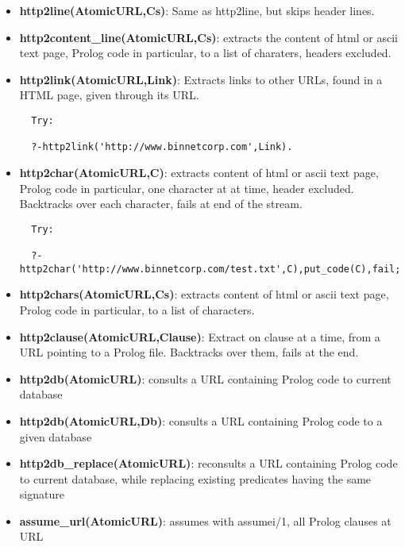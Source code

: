\documentclass{article}
\begin{document}
\begin{itemize}
\item {\bf http2line(AtomicURL,Cs)}:
 Same as http2line, but skips header lines.

\item {\bf http2content\_line(AtomicURL,Cs)}: 
extracts the content of html or ascii text page, Prolog code in particular,
to a list of charaters, headers excluded.

\item {\bf http2link(AtomicURL,Link)}: Extracts links to other URLs, found in a HTML page,
  given through its URL.
\begin{verbatim}
  Try:

  ?-http2link('http://www.binnetcorp.com',Link).
\end{verbatim}


\item {\bf http2char(AtomicURL,C)}:
  extracts content of html or ascii text page, Prolog code in particular,
  one character at at time, header excluded.
  Backtracks over each character, fails at end of the stream.
\begin{verbatim}
  Try:

  ?-http2char('http://www.binnetcorp.com/test.txt',C),put_code(C),fail;nl.
\end{verbatim}


\item {\bf http2chars(AtomicURL,Cs)}: extracts content of html or ascii text page, Prolog code in particular,
to a list of characters.

\item {\bf http2clause(AtomicURL,Clause)}:  Extract on clause at a time, from a URL pointing to a Prolog file.
  Backtracks over them, fails at the end. 

\item {\bf http2db(AtomicURL)}:  consults a URL containing Prolog code to current database


\item {\bf http2db(AtomicURL,Db)}:  consults a URL containing Prolog code to a given database

\item {\bf http2db\_replace(AtomicURL)}:  reconsults a URL containing Prolog code to current database,
  while replacing existing predicates having the same signature

\item {\bf assume\_url(AtomicURL)}: assumes with assumei/1, all Prolog clauses at URL

\end{itemize}
\end{document}
